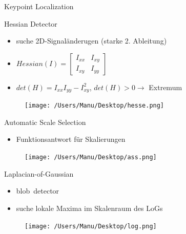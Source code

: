 \documentclass[paper=a4, fontsize=11pt]{scrartcl} %
\numberwithin{equation}{section} %
\numberwithin{figure}{section} %
\numberwithin{table}{section} %
\begin{document}
Keypoint Localization
\begin{itemize}
\begin{minipage}{0.55\textwidth}
\item Hessian Detector
\begin{itemize}
\item suche 2D-Signaländerugen (starke 2. Ableitung)
\item $Hessian(I) = 
\begin{bmatrix}
    I_{xx} & I_{xy} \\
    I_{xy} & I_{yy}
  \end{bmatrix}$
\item $det(H) = I_{xx} I_{yy} - I_{xy}^2$, $ det(H) > 0 \rightarrow$ Extremum
\end{itemize}
\end{minipage} \hfill
\begin{minipage}{0.3\textwidth}
\begin{figure}[H]
\texttt{[image: /Users/Manu/Desktop/hesse.png]}
\end{figure}
\end{minipage}
\begin{minipage}{0.6\textwidth}
\item Automatic Scale Selection
\begin{itemize}
\item Funktionsantwort für Skalierungen\\ 
\end{itemize}
\end{minipage} \hfill
\begin{minipage}{0.35\textwidth}
\begin{figure}[H]
\texttt{[image: /Users/Manu/Desktop/ass.png]}
\end{figure}
\end{minipage}
\begin{minipage}{0.55\textwidth}
\item Laplacian-of-Gaussian
\begin{itemize}
\item \glqq blob\grqq\ detector
\item suche lokale Maxima im Skalenraum des LoGs
\end{itemize}
\end{minipage} \hfill
\begin{minipage}{0.3\textwidth}
\begin{figure}[H]
\texttt{[image: /Users/Manu/Desktop/log.png]}
\end{figure}
\end{minipage}
\end{itemize}
\end{document}
